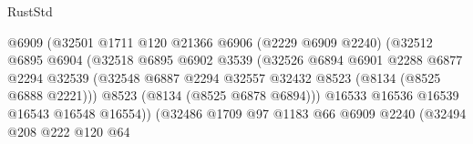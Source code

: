 \begin{lexlean}{RustStd}
\begin{coremodule}
                                          @6909
                                          (@32501
                                            @1711
                                            @120
                                            @21366
                                            @6906
                                            (@2229 @6909 @2240)
                                            (@32512
                                              @6895
                                              @6904
                                              (@32518
                                                @6895
                                                @6902
                                                @3539
                                                (@32526
                                                  @6894
                                                  @6901
                                                  @2288
                                                  @6877
                                                  @2294
                                                  @32539
                                                  (@32548
                                                    @6887
                                                    @2294
                                                    @32557
                                                    @32432
                                                    @8523
                                                    (@8134 (@8525 @6888 @2221)))
                                                  @8523
                                                  (@8134 (@8525 @6878 @6894)))
                                                @16533
                                                @16536
                                                @16539
                                                @16543
                                                @16548
                                                @16554))
                                            (@32486
                                              @1709
                                              @97
                                              @1183
                                              @66
                                              @6909
                                              @2240
                                              (@32494
                                                @208
                                                @222
                                                @120
                                                @64

\end{coremodule}
\end{lexlean}
